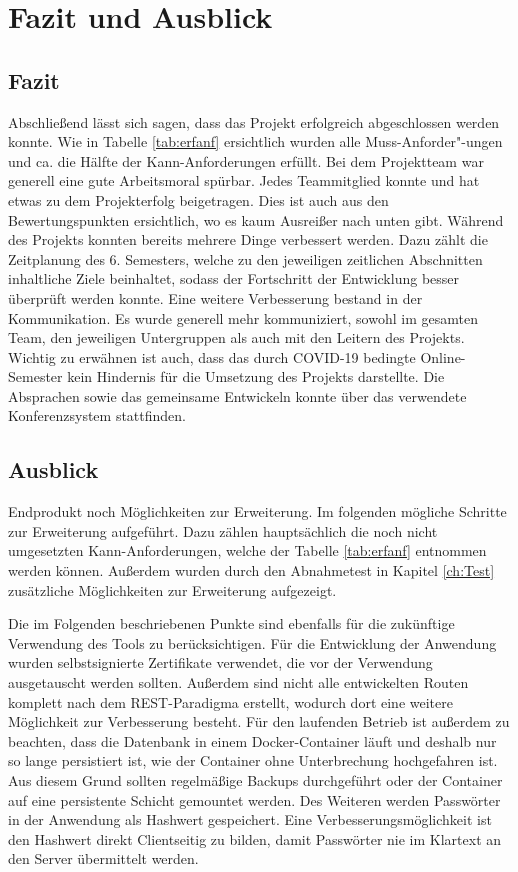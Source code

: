 \chapter{Fazit und Ausblick}
\section{Fazit}
Abschließend lässt sich sagen, dass das Projekt erfolgreich abgeschlossen werden konnte. 
Wie in Tabelle \vref{tab:erfanf} ersichtlich wurden alle Muss-Anforder"-ungen und ca. die Hälfte der Kann-Anforderungen erfüllt.
Bei dem Projektteam war generell eine gute Arbeitsmoral spürbar.
Jedes Teammitglied konnte und hat etwas zu dem Projekterfolg beigetragen.
Dies ist auch aus den Bewertungspunkten ersichtlich, wo es kaum Ausreißer nach unten gibt.
Während des Projekts konnten bereits mehrere Dinge verbessert werden. 
Dazu zählt die Zeitplanung des 6. Semesters, welche zu den jeweiligen zeitlichen Abschnitten inhaltliche Ziele beinhaltet, sodass der Fortschritt der Entwicklung besser überprüft werden konnte.
Eine weitere Verbesserung bestand in der Kommunikation.
Es wurde generell mehr kommuniziert, sowohl im gesamten Team, den jeweiligen Untergruppen als auch mit den Leitern des Projekts. 
Wichtig zu erwähnen ist auch, dass das durch COVID-19 bedingte Online-Semester kein Hindernis für die Umsetzung des Projekts darstellte.
Die Absprachen sowie das gemeinsame Entwickeln konnte über das verwendete Konferenzsystem stattfinden.

\section{Ausblick}
Endprodukt noch Möglichkeiten zur Erweiterung. Im folgenden mögliche Schritte zur Erweiterung aufgeführt.
Dazu zählen hauptsächlich die noch nicht umgesetzten Kann-Anforderungen, welche der Tabelle \vref{tab:erfanf} entnommen werden können.
Außerdem wurden durch den Abnahmetest in Kapitel \vref{ch:Test} zusätzliche Möglichkeiten zur Erweiterung aufgezeigt.

Die im Folgenden beschriebenen Punkte sind ebenfalls für die zukünftige Verwendung des Tools zu berücksichtigen.
Für die Entwicklung der Anwendung wurden selbstsignierte Zertifikate verwendet, die vor der Verwendung ausgetauscht werden sollten.
Außerdem sind nicht alle entwickelten Routen komplett nach dem REST-Paradigma erstellt, wodurch dort eine weitere Möglichkeit zur Verbesserung besteht.
Für den laufenden Betrieb ist außerdem zu beachten, dass die Datenbank in einem Docker-Container läuft und deshalb nur so lange persistiert ist, wie der Container ohne Unterbrechung hochgefahren ist.
Aus diesem Grund sollten regelmäßige Backups durchgeführt oder der Container auf eine persistente Schicht gemountet werden. 
Des Weiteren werden Passwörter in der Anwendung als Hashwert gespeichert.
Eine Verbesserungsmöglichkeit ist den Hashwert direkt Clientseitig zu bilden, damit Passwörter nie im Klartext an den Server übermittelt werden.